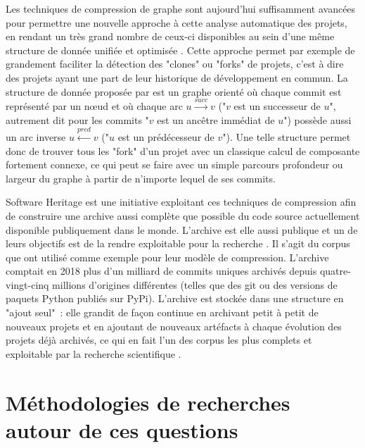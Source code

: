 Les techniques de compression de graphe sont aujourd'hui suffisamment avancées pour permettre une nouvelle
approche à cette analyse automatique des projets, en rendant un très grand nombre de ceux-ci disponibles au
sein d'une même structure de donnée unifiée et optimisée . Cette approche permet
par exemple de grandement faciliter la détection des "\glspl{clone}" ou "\glspl{fork}" de projets, c'est à
dire des projets ayant une part de leur historique de développement en commun. La structure de donnée proposée
par \textcite{swh-graph-2020} est un graphe orienté où chaque \gls{commit} est représenté par un nœud et où
chaque arc $u \xrightarrow{succ} v$ ("$v$ est un successeur de $u$", autrement dit pour les \glspl{commit}
"$v$ est un ancêtre immédiat de $u$") possède aussi un arc inverse $u \xleftarrow{pred} v$ ("$u$ est un
prédécesseur de $v$"). Une telle structure permet donc de trouver tous les "\gls{fork}" d'un projet avec un
classique calcul de composante fortement connexe, ce qui peut se faire avec un simple parcours profondeur ou
largeur du graphe à partir de n'importe lequel de ses \glspl{commit}.

Software Heritage est une initiative exploitant ces
techniques de compression afin de construire une archive aussi complète que possible du code source
actuellement disponible publiquement dans le monde. L'archive est elle aussi publique et un de leurs objectifs
est de la rendre exploitable pour la recherche . Il s'agit du corpus que
\textcite{swh-graph-2020} ont utilisé comme exemple pour leur modèle de compression. L'archive comptait en
2018 plus d'un milliard de \glspl{commit} uniques archivés depuis quatre-vingt-cinq millions d'origines
différentes (telles que des  \gls{git} ou des versions de paquets Python publiés sur
PyPi). L'archive est stockée dans une structure en "ajout seul" : elle
grandit de façon continue en archivant petit à petit de nouveaux projets et en ajoutant de nouveaux artéfacts
à chaque évolution des projets déjà archivés, ce qui en fait l'un des corpus les plus complets et exploitable
par la recherche scientifique .

\section{Méthodologies de recherches autour de ces questions}

